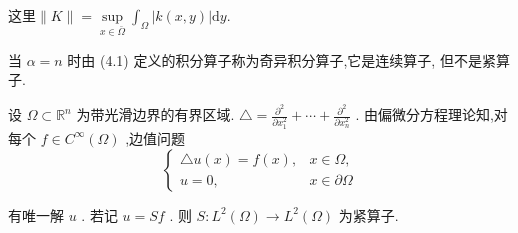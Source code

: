 \documentclass[lang=cn,newtx,10pt,scheme=chinese,thmcnt=chapter]{elegantbook}
\newcommand{\dif}{\mathrm{d}}
\begin{document}
\begin{note}
    这里$\|K\|=\sup\limits_{x\in\bar{\Omega}}\int_\Omega |k(x,y)|\dif y$.
\end{note}
\begin{note}
    当 \(\alpha  = n\) 时由 (4.1) 定义的积分算子称为奇异积分算子,它是连续算子, 但不是紧算子.
\end{note}
\begin{example}
    设 \(\Omega  \subset  {\mathbb{R}}^{n}\) 为带光滑边界的有界区域. \(\bigtriangleup  = \frac{{\partial }^{2}}{\partial {x}_{1}^{2}} + \cdots  + \frac{{\partial }^{2}}{\partial {x}_{n}^{2}}\) . 由偏微分方程理论知,对每个 \(f \in  {C}^{\infty }\left( \Omega \right)\) ,边值问题
\begin{equation}
\left\{  \begin{array}{ll} \bigtriangleup u\left( x\right)  = f\left( x\right) , & x \in  \Omega , \\  u = 0, & x \in  \partial \Omega  \end{array}\right.  \label{4.2}
\end{equation}

有唯一解 \(u\) . 若记 \(u = {Sf}\) . 则 \(S : {L}^{2}\left( \Omega \right)  \rightarrow  {L}^{2}\left( \Omega \right)\) 为紧算子.

\end{example}
\end{document}
